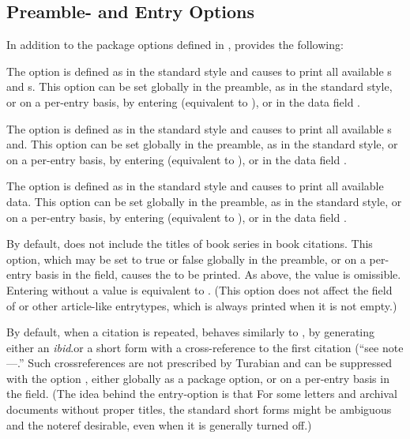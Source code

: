 \documentclass{ltxdockit}[2010/02/12]
\begin{document}

\subsection{Preamble- and Entry Options}
In addition to the package options defined in ,  provides the following:

\begin{optionlist}

\label{printurlsoption}
The  option is defined as in the standard style and causes  to print all available s and s. This option can be set globally in the preamble, as in the standard style, or on a per-entry basis, by entering  (equivalent to ),  or  in the data field .

The  option is defined as in the standard style and causes  to print all available s and. This option can be set globally in the preamble, as in the standard style, or on a per-entry basis, by entering  (equivalent to ),  or  in the data field .

The  option is defined as in the standard style and causes  to print all available  data. This option can be set globally in the preamble, as in the standard style, or on a per-entry basis, by entering  (equivalent to ),  or  in the data field .

\label{printseriesoption}
By default,  does not include the titles of book series in book citations. This option, which may be set to true or false globally in the preamble, or on a per-entry basis in the  field, causes the  to be printed. As above, the value  is omissible. Entering  without a value is equivalent to .
(This option does not affect the  field of  or other article-like entrytypes, which is always printed when it is not empty.)

\label{printnoterefsoption}
By default, when a citation is repeated,  behaves similarly to , by generating either an \emph{ibid}.\midsentence or a short form with a cross-reference to the first citation (\ie \enquote{see note---.} Such crossreferences are not prescribed by Turabian and can be suppressed with the option , either globally as a package option, or on a per-entry basis in the  field. (The idea behind the entry-option is that For some letters and archival documents without proper titles, the standard short forms might be ambiguous and the noteref desirable, even when it is generally turned off.)



\end{optionlist}
\end{document}
